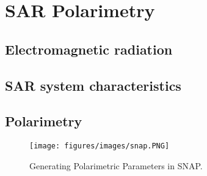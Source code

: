 \chapter{SAR Polarimetry}\label{chp:obs}%


\section{Electromagnetic radiation}
\section{SAR system characteristics} \label{sec:pr_obs}
\section{Polarimetry}

	\begin{figure}[H]
    \centering
    \texttt{[image: figures/images/snap.PNG]}
    \decoRule
    \caption[Generating Polarimetric Parameters in SNAP]{Generating Polarimetric Parameters in SNAP.}
    \label{fig:undercatch}
\end{figure}

	


